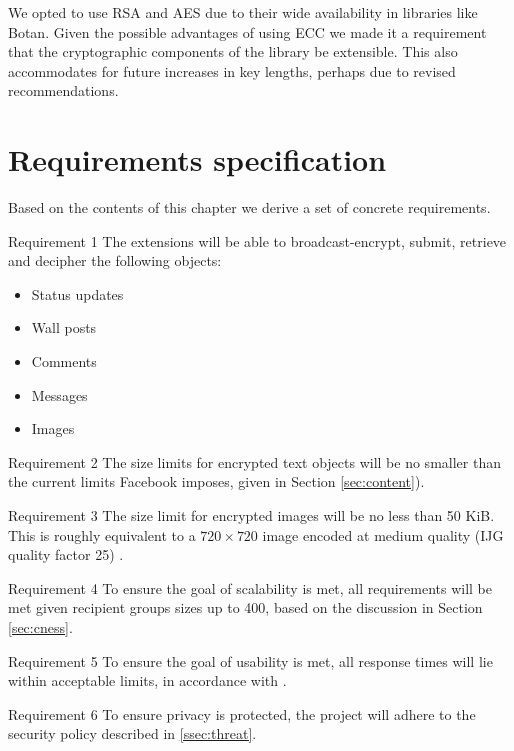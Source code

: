 We opted to use RSA and AES due to their wide availability in libraries like Botan. Given the possible advantages of using ECC we made it a requirement that the cryptographic components of the library be extensible. This also accommodates for future increases in key lengths, perhaps due to revised recommendations. 


\FloatBarrier
\section{Requirements specification}
\label{sec:req}

Based on the contents of this chapter we derive a set of concrete requirements.
        
\begin{desc}

    \item[Requirement 1] The extensions will be able to broadcast-encrypt, submit, retrieve and decipher the following objects:
    
    \begin{itemize}
        \item Status updates
        \item Wall posts
        \item Comments
        \item Messages
        \item Images
    \end{itemize}
    
    \item[Requirement 2] The size limits for encrypted text objects will be no smaller than the current limits Facebook imposes, given in Section \ref{sec:content}).

    \item[Requirement 3] The size limit for encrypted images will be no less than 50 KiB. This is roughly equivalent to a $720 \times 720$ image encoded at medium quality (IJG quality factor 25) \cite{ijg}.

    \item[Requirement 4] To ensure the goal of scalability is met, all requirements will be met given recipient groups sizes up to 400, based on the discussion in Section \ref{sec:cness}.
    
    
    \item[Requirement 5] To ensure the goal of usability is met, all response times will lie within acceptable limits, in accordance with \cite{response}.


    \item[Requirement 6] To ensure privacy is protected, the project will adhere to the security policy described in \ref{ssec:threat}.



\end{desc}
